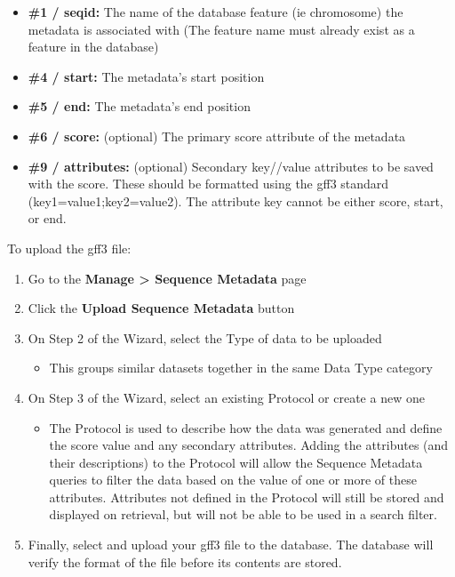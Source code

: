 \documentclass[
  12pt,
]{book}
\providecommand{\tightlist}{%
  \setlength{\itemsep}{0pt}\setlength{\parskip}{0pt}}
\begin{document}
\begin{itemize}
\tightlist
\item
  \textbf{\#1 / seqid:} The name of the database feature (ie chromosome) the metadata is associated with (The feature name must already exist as a feature in the database)
\item
  \textbf{\#4 / start:} The metadata's start position
\item
  \textbf{\#5 / end:} The metadata's end position
\item
  \textbf{\#6 / score:} (optional) The primary score attribute of the metadata
\item
  \textbf{\#9 / attributes:} (optional) Secondary key//value attributes to be saved with the score. These should be formatted using the gff3 standard (key1=value1;key2=value2). The attribute key cannot be either score, start, or end.
\end{itemize}

To upload the gff3 file:

\begin{enumerate}
\def\labelenumi{\arabic{enumi}.}
\tightlist
\item
  Go to the \textbf{Manage \textgreater{} Sequence Metadata} page
\item
  Click the \textbf{Upload Sequence Metadata} button
\item
  On Step 2 of the Wizard, select the Type of data to be uploaded

  \begin{itemize}
  \tightlist
  \item
    This groups similar datasets together in the same Data Type category
  \end{itemize}
\item
  On Step 3 of the Wizard, select an existing Protocol or create a new one

  \begin{itemize}
  \tightlist
  \item
    The Protocol is used to describe how the data was generated and define the score value and any secondary attributes. Adding the attributes (and their descriptions) to the Protocol will allow the Sequence Metadata queries to filter the data based on the value of one or more of these attributes. Attributes not defined in the Protocol will still be stored and displayed on retrieval, but will not be able to be used in a search filter.
  \end{itemize}
\item
  Finally, select and upload your gff3 file to the database. The database will verify the format of the file before its contents are stored.
\end{enumerate}
\end{document}
